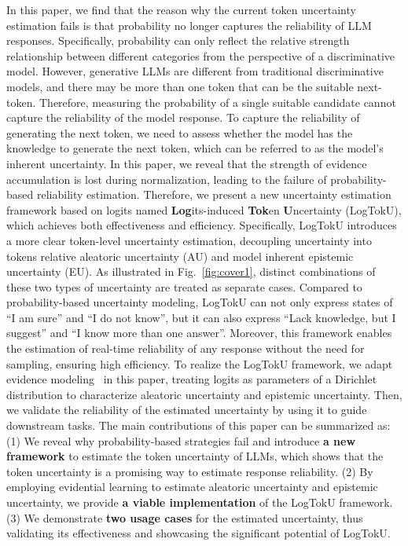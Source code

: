 In this paper, we find that the reason why the current token uncertainty estimation fails is that probability no longer captures the reliability of LLM responses. Specifically, probability can only reflect the relative strength relationship between different categories from the perspective of a discriminative model. However, generative LLMs are different from traditional discriminative models, and there may be more than one token that can be the suitable next-token. Therefore, measuring the probability of a single suitable candidate cannot capture the reliability of the model response. To capture the reliability of generating the next token, we need to assess whether the model has the knowledge to generate the next token, which can be referred to as the model's inherent uncertainty. In this paper, we reveal that the strength of evidence accumulation is lost during normalization, leading to the failure of probability-based reliability estimation. Therefore, we present a new uncertainty estimation framework based on logits named \textbf{Log}its-induced \textbf{Tok}en \textbf{U}ncertainty (LogTokU), which achieves both effectiveness and efficiency. Specifically, LogTokU introduces a more clear token-level uncertainty estimation, decoupling uncertainty into tokens relative aleatoric uncertainty (AU) and model inherent epistemic uncertainty (EU). As illustrated in Fig.~\ref{fig:cover1}, distinct combinations of these two types of uncertainty are treated as separate cases. Compared to probability-based uncertainty modeling, LogTokU can not only express states of ``I am sure'' and ``I do not know'', but it can also express ``Lack knowledge, but I suggest'' and ``I know more than one answer''. Moreover, this framework enables the estimation of real-time reliability of any response without the need for sampling, ensuring high efficiency. To realize the LogTokU framework, we adapt evidence modeling~\cite{sensoy2018evidential} in this paper, treating logits as parameters of a Dirichlet distribution to characterize aleatoric uncertainty and epistemic uncertainty. Then, we validate the reliability of the estimated uncertainty by using it to guide downstream tasks.
The main contributions of this paper can be summarized as: (1) We reveal why probability-based strategies fail and introduce \textbf{a new framework} to estimate the token uncertainty of LLMs, which shows that the token uncertainty is a promising way to estimate response reliability. (2) By employing evidential learning to estimate aleatoric uncertainty and epistemic uncertainty, we provide \textbf{a viable implementation} of the LogTokU framework. 
(3) We demonstrate \textbf{two usage cases} for the estimated uncertainty, thus validating its effectiveness and showcasing the significant potential of LogTokU. 




